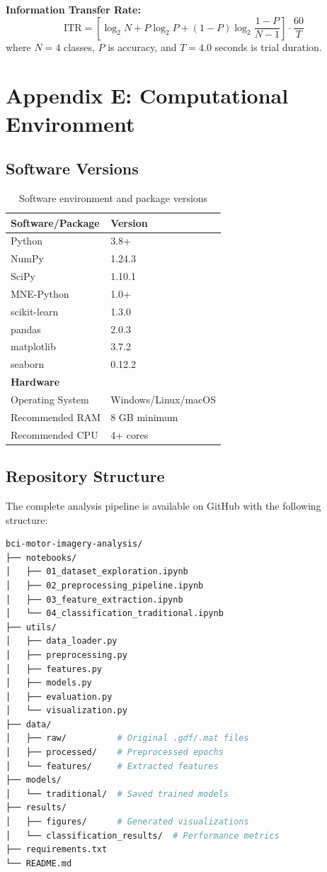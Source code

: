 \documentclass[11pt]{article}
\begin{document}
\textbf{Information Transfer Rate:}
\begin{equation}
\text{ITR} = \left[\log_2 N + P \log_2 P + (1-P) \log_2 \frac{1-P}{N-1}\right] \cdot \frac{60}{T}
\end{equation}
where $N=4$ classes, $P$ is accuracy, and $T=4.0$ seconds is trial duration.

\section{Appendix E: Computational Environment}

\subsection{Software Versions}

\begin{table}[H]
\centering
\caption{Software environment and package versions}
\begin{tabular}{@{}ll@{}}
\toprule
\textbf{Software/Package} & \textbf{Version} \\
\midrule
Python & 3.8+ \\
NumPy & 1.24.3 \\
SciPy & 1.10.1 \\
MNE-Python & 1.0+ \\
scikit-learn & 1.3.0 \\
pandas & 2.0.3 \\
matplotlib & 3.7.2 \\
seaborn & 0.12.2 \\
\midrule
\textbf{Hardware} & \\
Operating System & Windows/Linux/macOS \\
Recommended RAM & 8 GB minimum \\
Recommended CPU & 4+ cores \\
\bottomrule
\end{tabular}
\end{table}

\subsection{Repository Structure}

The complete analysis pipeline is available on GitHub with the following structure:

\begin{lstlisting}[language=bash, basicstyle=\ttfamily\footnotesize]
bci-motor-imagery-analysis/
├── notebooks/
│   ├── 01_dataset_exploration.ipynb
│   ├── 02_preprocessing_pipeline.ipynb
│   ├── 03_feature_extraction.ipynb
│   └── 04_classification_traditional.ipynb
├── utils/
│   ├── data_loader.py
│   ├── preprocessing.py
│   ├── features.py
│   ├── models.py
│   ├── evaluation.py
│   └── visualization.py
├── data/
│   ├── raw/          # Original .gdf/.mat files
│   ├── processed/    # Preprocessed epochs
│   └── features/     # Extracted features
├── models/
│   └── traditional/  # Saved trained models
├── results/
│   ├── figures/      # Generated visualizations
│   └── classification_results/  # Performance metrics
├── requirements.txt
└── README.md
\end{lstlisting}
\end{document}

